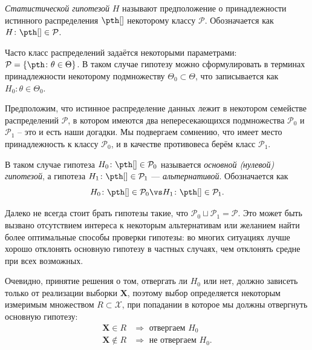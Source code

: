\begin{definition}
\textit{Статистической гипотезой} $H$ называют предположение о принадлежности истинного распределения $\pth[]$ некоторому классу $\mathcal{P}$. Обозначается как $H\colon \pth[] \in \mathcal{P}$.
\end{definition}

Часто класс распределений задаётся некоторыми параметрами:
$\mathcal{P} = \{\pth\colon \theta \in \Theta\}$. В таком случае гипотезу можно сформулировать в терминах принадлежности некоторому подмножеству $\Theta_0 \subset \Theta$, что записывается как $H_0 \colon \theta \in \Theta_0$.

Предположим, что истинное распределение данных лежит в некотором семействе распределений $\mathcal{P}$, в котором имеются два непересекающихся подмножества $\mathcal{P}_0$ и $\mathcal{P}_1$ -- это и есть наши догадки. Мы подвергаем сомнению, что имеет место принадлежность к классу $\mathcal{P}_0$, и в качестве противовеса берём класс $\mathcal{P}_1$.

\begin{definition}
В таком случае гипотеза $H_0\colon \pth[] \in \mathcal{P}_0$ называется \textit{основной (нулевой) гипотезой}, а гипотеза $H_1\colon \pth[] \in \mathcal{P}_1$ --- \textit{альтернативой}. Обозначается как
\[
H_0\colon \pth[] \in \mathcal{P}_0 \vs H_1\colon \pth[] \in \mathcal{P}_1.
\]
\end{definition}

\begin{remark}
	Далеко не всегда стоит брать гипотезы такие, что $\mathcal{P}_0 \sqcup \mathcal{P}_1 = \mathcal{P}$. Это может быть вызвано отсутствием интереса к некоторым альтернативам или желанием найти более оптимальные способы проверки гипотезы: во многих ситуациях лучше хорошо отклонять основную гипотезу в частных случаях, чем отклонять средне при всех возможных.
\end{remark}

Очевидно, принятие решения о том, отвергать ли $H_0$ или нет, должно зависеть только от реализации выборки $\mathbf X$, поэтому выбор определяется некоторым измеримым множеством $R \subset \mathcal{X}$, при попадании в которое мы должны отвергнуть основную гипотезу:
\[
\begin{aligned}
\mathbf X \in R &\Longrightarrow \text{ отвергаем } H_0\\
\mathbf X \notin R &\Longrightarrow \text{ не отвергаем } H_0.
\end{aligned}
\]

